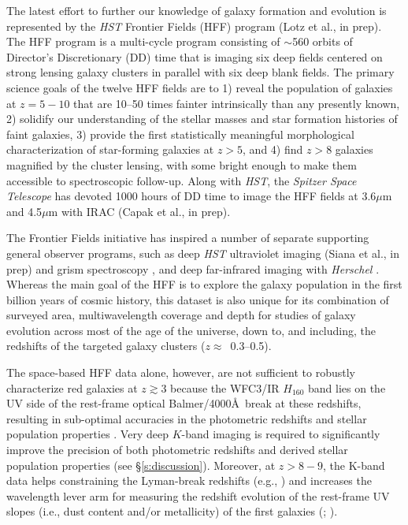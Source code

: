 \documentclass[preprint2]{aastex6}
\begin{document}
The latest effort to further our knowledge of galaxy formation and evolution is represented by the {\it HST} Frontier Fields (HFF) program (Lotz et al., in prep). The HFF program is a multi-cycle program consisting of $\sim$560 orbits of Director's Discretionary (DD) time that is imaging six deep fields centered on strong lensing galaxy clusters in parallel with six deep blank fields. The primary science goals of the twelve HFF fields are to 1) reveal the population of galaxies at $z=5-10$ that are 10--50 times fainter intrinsically than any presently known, 2) solidify our understanding of the stellar masses and star formation histories of faint galaxies, 3) provide the first statistically meaningful morphological characterization of star-forming galaxies at $z>5$, and 4) find $z>8$ galaxies magnified by the cluster lensing, with some bright enough to make them accessible to spectroscopic follow-up. Along with {\it HST}, the {\it Spitzer Space Telescope} has devoted 1000 hours of DD time to image the HFF fields at 3.6$\mu$m and 4.5$\mu$m with IRAC (Capak et al., in prep).  

The Frontier Fields initiative has inspired a number of separate supporting general observer programs, such as deep \textit{HST} ultraviolet imaging (Siana et al., in prep) and grism spectroscopy \citep[GLASS, ][]{treu:glass}, and deep far-infrared imaging with \textit{Herschel} \citep{rawle:16}.  Whereas the main goal of the HFF is to explore the galaxy population in the first billion years of cosmic history, this dataset is also unique for its combination of surveyed area, multiwavelength coverage and depth for studies of galaxy evolution across most of the age of the universe, down to, and including, the redshifts of the targeted galaxy clusters ($z\approx$~0.3--0.5). 

The space-based HFF data alone, however, are not sufficient to robustly characterize red galaxies at $z\gtrsim3$ because the WFC3/IR $H_{160}$ band lies on the UV side of the rest-frame optical Balmer/4000\AA~break at these redshifts, resulting in sub-optimal accuracies in the photometric redshifts and stellar population properties \citep[e.g., stellar mass and rest-frame optical color;][]{muzzin:09}. Very deep $K$-band imaging is required to significantly improve the precision of both photometric redshifts and derived stellar population properties (see \S\ref{s:discussion}). Moreover, at $z>8-9$, the K-band data helps constraining the Lyman-break redshifts (e.g., \citealt{bouwens:13}) and increases the wavelength lever arm for measuring the redshift evolution of the rest-frame UV slopes (i.e., dust content and/or metallicity) of the first galaxies (\citealt{bouwens:12a}; \citealt{bouwens:13}).
\end{document}
